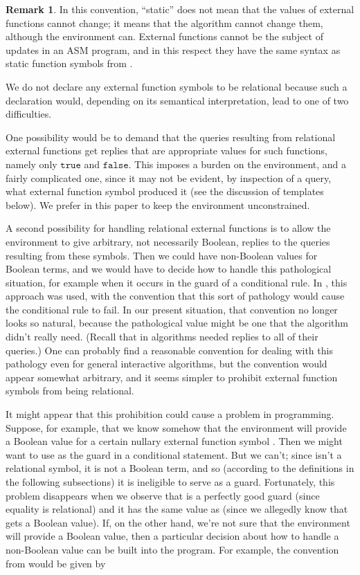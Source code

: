 \documentclass{LMCS}
\theoremstyle{definition}
\newtheorem{rmk}[thm]{Remark}
\newcommand{\ttt}[1]{\ensuremath{\mathtt {#1}}}
\begin{document}
\begin{rmk}
  In this convention, ``static'' does not mean that the values of
  external functions cannot change; it means that the algorithm cannot
  change them, although the environment can.  External functions
  cannot be the subject of updates in an ASM program, and in this
  respect they have the same syntax as static function symbols from
  .

We do not declare any external function symbols to be relational
because such a declaration would, depending on its semantical
interpretation, lead to one of two difficulties.

One possibility would be to demand that the queries resulting from
relational external functions get replies that are appropriate values
for such functions, namely only \ttt{true} and \ttt{false}.  This
imposes a burden on the environment, and a fairly complicated one,
since it may not be evident, by inspection of a query, what external
function symbol produced it (see the discussion of templates below).
We prefer in this paper to keep the environment unconstrained.

A second possibility for handling relational external functions is to
allow the environment to give arbitrary, not necessarily Boolean,
replies to the queries resulting from these symbols.  Then we could
have non-Boolean values for Boolean terms, and we would have to decide
how to handle this pathological situation, for example when it occurs
in the guard of a conditional rule.  In \cite[Section~5]{oa2}, this
approach was used, with the convention that this sort of pathology
would cause the conditional rule to fail.  In our present situation,
that convention no longer looks so natural, because the pathological
value might be one that the algorithm didn't really need.  (Recall
that in \cite{oa1,oa2,oa3} algorithms needed replies to all of their
queries.)  One can probably find a reasonable convention for dealing
with this pathology even for general interactive algorithms, but the
convention would appear somewhat arbitrary, and it seems simpler to
prohibit external function symbols from being relational.

It might appear that this prohibition could cause a problem in
programming.  Suppose, for example, that we know somehow that the
environment will provide a Boolean value for a certain nullary
external function symbol .  Then we might want to use  as the
guard in a conditional statement.  But we can't; since  isn't a
relational symbol, it is not a Boolean term, and so (according to the
definitions in the following subsections) it is ineligible to serve as
a guard.  Fortunately, this problem disappears when we observe that
 is a perfectly good guard (since equality is
relational) and it has the same value as  (since we allegedly know
that  gets a Boolean value).  If, on the other hand, we're not sure
that the environment will provide a Boolean value, then a particular
decision about how to handle a non-Boolean value can be built into the
program.  For example, the convention from \cite{oa2} would be given
by


\end{rmk}
\end{document}
